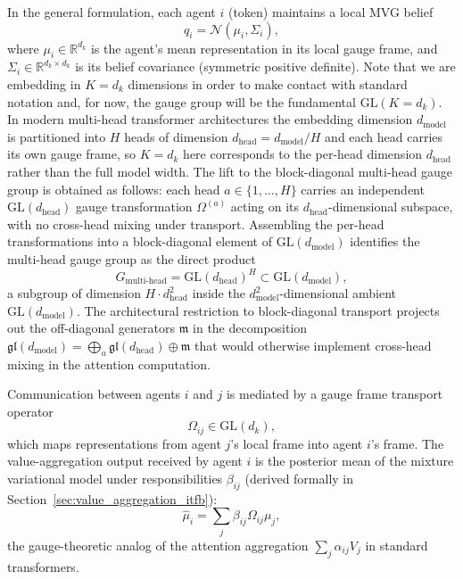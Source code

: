 \documentclass[11pt]{article}
\begin{document}
In the general formulation, each agent $i$ (token) maintains a local MVG belief
\begin{equation}
q_i = \mathcal{N}(\mu_i, \Sigma_i),
\end{equation}
where $\mu_i \in \mathbb{R}^{d_k}$ is the agent's mean representation in its local gauge frame, and $\Sigma_i \in \mathbb{R}^{d_k\times d_k}$ is its belief covariance (symmetric positive definite). Note that we are embedding in $K=d_k$ dimensions in order to make contact with standard notation and, for now, the gauge group will be the fundamental $\mathrm{GL}(K=d_k)$. In modern multi-head transformer architectures the embedding dimension $d_{\text{model}}$ is partitioned into $H$ heads of dimension $d_{\text{head}} = d_{\text{model}}/H$ and each head carries its own gauge frame, so $K=d_k$ here corresponds to the per-head dimension $d_{\text{head}}$ rather than the full model width. The lift to the block-diagonal multi-head gauge group is obtained as follows: each head $a \in \{1,\ldots,H\}$ carries an independent $\mathrm{GL}(d_{\text{head}})$ gauge transformation $\Omega^{(a)}$ acting on its $d_{\text{head}}$-dimensional subspace, with no cross-head mixing under transport. Assembling the per-head transformations into a block-diagonal element of $\mathrm{GL}(d_{\text{model}})$ identifies the multi-head gauge group as the direct product
\begin{equation}
G_{\text{multi-head}} = \mathrm{GL}(d_{\text{head}})^H \subset \mathrm{GL}(d_{\text{model}}),
\label{eq:multihead_gauge_group}
\end{equation}
a subgroup of dimension $H \cdot d_{\text{head}}^2$ inside the $d_{\text{model}}^2$-dimensional ambient $\mathrm{GL}(d_{\text{model}})$. The architectural restriction to block-diagonal transport projects out the off-diagonal generators $\mathfrak{m}$ in the decomposition $\mathfrak{gl}(d_{\text{model}}) = \bigoplus_a \mathfrak{gl}(d_{\text{head}}) \oplus \mathfrak{m}$ that would otherwise implement cross-head mixing in the attention computation.

Communication between agents $i$ and $j$ is mediated by a gauge frame transport operator
\begin{equation}
\Omega_{ij} \in \mathrm{GL}(d_k),
\end{equation}
which maps representations from agent $j$'s local frame into agent $i$'s frame. The value-aggregation output received by agent $i$ is the posterior mean of the mixture variational model under responsibilities $\beta_{ij}$ (derived formally in Section~\ref{sec:value_aggregation_itfb}):
\begin{equation}
\hat\mu_i = \sum_j \beta_{ij} \Omega_{ij}\mu_j,
\end{equation}
the gauge-theoretic analog of the attention aggregation $\sum_j \alpha_{ij} V_j$ in standard transformers.
\end{document}
